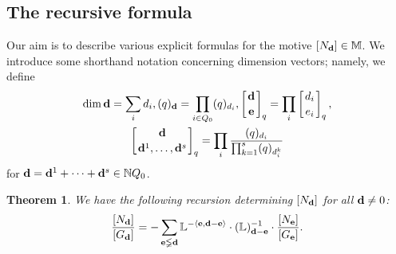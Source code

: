 \documentclass[10pt,a4paper]{amsart}
\numberwithin{equation}{section}
\newtheorem{Theorem}{Theorem}[section]
\theoremstyle{definition}
\begin{document}
\subsection{The recursive formula}

Our aim is to describe various explicit formulas for the motive $[N_{\bf d}]\in \mathbb{M}$. We introduce some shorthand notation concerning dimension vectors; namely, we define
\begin{gather*}
\dim {\bf d}=\sum_id_i, (q)_{\bf d}=\prod_{i\in Q_0}(q)_{d_i}, \left[{{\bf d}\atop{\bf e}}\right]_q=\prod_{i}\left[{d_i\atop e_i}\right]_q,\\
 \left[{{\bf d}\atop{{\bf d}^1,\dots,{\bf d}^s}}\right]_q=\prod_i\frac{(q)_{d_i}}{\prod_{k=1}^s(q)_{d^k_i}}\end{gather*}
for ${\bf d}={\bf d}^1+\dots+{\bf d}^s\in\mathbb{N}Q_0$.


\begin{Theorem}\label{thm1} We have the following recursion determining $[N_{\bf d}]$ for all ${\bf d}\not=0$:
\[\frac{[N_{\bf d}]}{[G_{\bf d}]}=-\sum_{{\bf e}\lneqq{\bf d}}\mathbb{L}^{-\langle{\bf e},{\bf d}-{\bf e}\rangle}\cdot(\mathbb{L})_{{\bf d}-{\bf e}}^{-1}\cdot\frac{[N_{\bf e}]}{[G_{\bf e}]}.\]
\end{Theorem}
\end{document}

